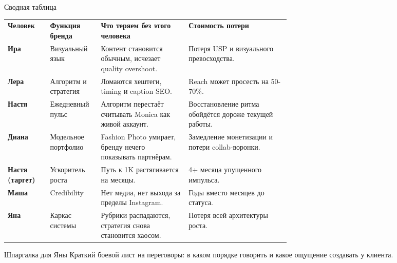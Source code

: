 \documentclass[11pt,a4paper]{article}
\begin{document}
\begin{glassbox}
{\headingfont\fontsize{20}{22}\selectfont Сводная таблица}\par
\vspace{2mm}
\begin{tabularx}{\linewidth}{>{\raggedright\arraybackslash}p{0.15\linewidth} >{\raggedright\arraybackslash}p{0.18\linewidth} >{\raggedright\arraybackslash}p{0.31\linewidth} Y}
\toprule
{}
\textbf{Человек} & \textbf{Функция бренда} & \textbf{Что теряем без этого человека} & \textbf{Стоимость потери} \\
\textbf{Ира} & Визуальный язык & Контент становится обычным, исчезает quality overshoot. & Потеря USP и визуального превосходства. \\
\textbf{Лера} & Алгоритм и стратегия & Ломаются хештеги, timing и caption SEO. & Reach может просесть на 50-70\%. \\
\textbf{Настя} & Ежедневный пульс & Алгоритм перестаёт считывать Monica как живой аккаунт. & Восстановление ритма обойдётся дороже текущей работы. \\
\textbf{Диана} & Модельное портфолио & Fashion Photo умирает, бренду нечего показывать партнёрам. & Замедление монетизации и потери collab-воронки. \\
\textbf{Настя (таргет)} & Ускоритель роста & Путь к 1K растягивается на месяцы. & 4+ месяца упущенного импульса. \\
\textbf{Маша} & Credibility & Нет медиа, нет выхода за пределы Instagram. & Годы вместо месяцев до статуса. \\
\textbf{Яна} & Каркас системы & Рубрики распадаются, стратегия снова становится хаосом. & Потеря всей архитектуры роста. \\
\bottomrule
\end{tabularx}
\end{glassbox}

\clearpage

\begin{glassbox}
{\headingfont\fontsize{23}{25}\selectfont Шпаргалка для Яны}\hfill
{\color{muted}\sansfont\fontsize{9.5}{12}\selectfont Краткий боевой лист на переговоры: в каком порядке говорить и какое ощущение создавать у клиента.}
\end{glassbox}

\vspace{3mm}
\end{document}
